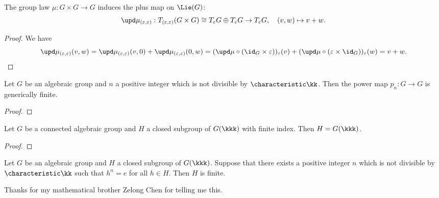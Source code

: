     \begin{proposition}\label{prop:multiplication_of_group_induces_plus_on_Lie_algebra}
        The group law \(\mu: G \times G \to G\) induces the plus map on \(\Lie(G)\):
        \[
            \upd\mu_{(\varepsilon,\varepsilon)}: T_{(\varepsilon,\varepsilon)}(G \times G) \cong T_\varepsilon G \oplus T_\varepsilon G \to T_\varepsilon G, \quad (v,w) \mapsto v + w.
        \]
    \end{proposition}
    \begin{proof}
        We have 
        \[ \upd \mu_{(\varepsilon,\varepsilon)}(v,w) = \upd \mu_{(\varepsilon,\varepsilon)}(v,0) + \upd \mu_{(\varepsilon,\varepsilon)}(0,w) = (\upd \mu \circ (\id_G \times \varepsilon))_\varepsilon(v) + (\upd \mu \circ (\varepsilon \times \id_G))_\varepsilon(w) = v + w. \]
    \end{proof}

    \begin{proposition}\label{prop:power_map_is_generically_finite}
        Let \(G\) be an algebraic group and \(n\) a positive integer which is not divisible by \(\characteristic \kk\).
        Then the power map \(p_n: G \to G\) is generically finite.
    \end{proposition}
    \begin{proof}
    \end{proof}

    \begin{corollary}\label{cor:finite_index_subgroup_of_connected_algebraic_group}
        Let \(G\) be a connected algebraic group and \(H\) a closed subgroup of \(G(\kkk)\) with finite index.
        Then \(H = G(\kkk)\).
    \end{corollary}
    \begin{proof}
    \end{proof}

    \begin{corollary}\label{cor:Burnside_theorem_on_finite_exponent_subgroup_of_algebraic_subgroup}
        Let \(G\) be an algebraic group and \(H\) a closed subgroup of \(G(\kkk)\).
        Suppose that there exists a positive integer \(n\) which is not divisible by \(\characteristic \kk\) such that \(h^n = e\) for all \(h \in H\).
        Then \(H\) is finite.
    \end{corollary}

    \begin{remark}\label{rmk:acknowledge_Burnside_theorem_on_finite_exponent_subgroup_of_algebraic_subgroup}
        Thanks for my mathematical brother Zelong Chen for telling me this.
    \end{remark}

